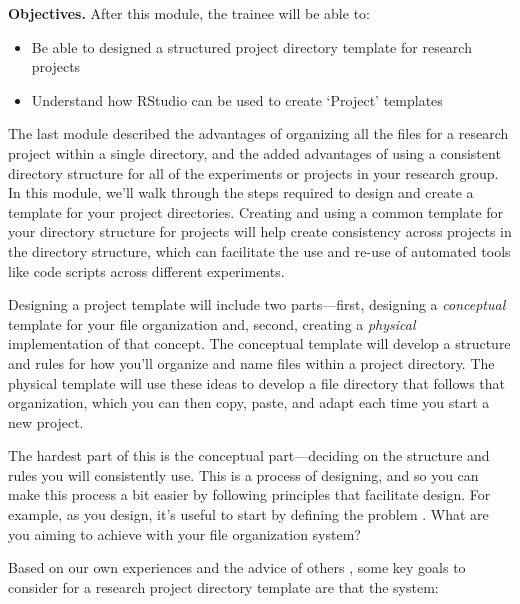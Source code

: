 \documentclass[]{tufte-book}
\providecommand{\tightlist}{%
  \setlength{\itemsep}{0pt}\setlength{\parskip}{0pt}}
\begin{document}
\textbf{Objectives.} After this module, the trainee will be able to:

\begin{itemize}
\tightlist
\item
  Be able to designed a structured project directory template for
  research projects
\item
  Understand how RStudio can be used to create `Project' templates
\end{itemize}

The last module described the advantages of organizing all the files for a
research project within a single directory, and the added advantages of using a
consistent directory structure for all of the experiments or projects in your
research group. In this module, we'll walk through the steps required to design
and create a template for your project directories. Creating and using a common
template for your directory structure for projects will help create consistency
across projects in the directory structure, which can facilitate the use and
re-use of automated tools like code scripts across different experiments.

Designing a project template will include two parts---first, designing a
\emph{conceptual} template for your file organization and, second, creating a
\emph{physical} implementation of that concept. The conceptual template will
develop a structure and rules for how you'll organize and name files within a
project directory. The physical template will use these ideas to develop a file
directory that follows that organization, which you can then copy, paste, and
adapt each time you start a new project.

The hardest part of this is the conceptual part---deciding on the structure and
rules you will consistently use. This is a process of designing, and so you can
make this process a bit easier by following principles that facilitate design.
For example, as you design, it's useful to start by defining the problem
\citep{osann2020design}. What are you aiming to achieve with your file organization
system?

Based on our own experiences and the advice of others \citep{marwick2018packaging, bertin2021creating}, some key goals to consider for a research project
directory template are that the system:
\end{document}
